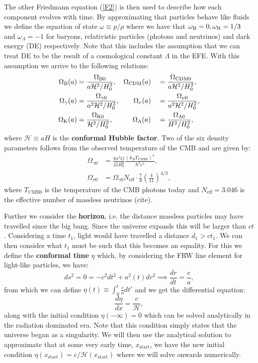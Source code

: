 \documentclass[%
reprint,
 amsmath,amssymb,
 aps,
]{revtex4-2}
\newcommand{\Hp}{\mathcal{H}}
\begin{document}
The other Friedmann equation (\ref{F2}) is then used to describe how each component evolves with time. By approximating that particles behave like fluids we define the equation of state $\omega\equiv p/\rho$ where we have that $\omega_{\text B}=0,\omega_{\text{R}}=1/3$ and $\omega_\Lambda=-1$ for baryons, relativistic particles (photons and neutrinos) and dark energy (DE) respectively. Note that this includes the assumption that we can treat DE to be the result of a cosmological constant $\Lambda$ in the EFE. With this assumption we arrive to the following relations:
\begin{alignat}{2}
	\Omega_{\text B}(a)&=\frac{\Omega_{\text B0}}{a\Hp^2/H_0^2},\hspace{3.5mm}\Omega_{\text{CDM}}(a)&&=\frac{\Omega_{\text{CDM}0}}{a\Hp^2/H_0^2},\nonumber\\
	\label{Otot}
	\Omega_{\gamma}(a)&=\frac{\Omega_{\gamma0}}{a^2\Hp^2/H_0^2},\hspace{7mm}\Omega_{\nu}(a)&&=\frac{\Omega_{\nu0}}{a^2\Hp^2/H_0^2},\\
	\Omega_{\text K}(a)&=\frac{\Omega_{\text K0}}{\Hp^2/H_0^2},\hspace{10mm}\Omega_{\Lambda}(a)&&=\frac{\Omega_{\Lambda0}}{H^2/H_0^2},\nonumber
\end{alignat}
where $\Hp\equiv aH$ is the \textbf{conformal Hubble factor}. 
Two of the six density parameters follows from the observed temperature of the CMB and are given by:
\begin{align}
	\label{ORad}
	\Omega_{\gamma0}&=\frac{8\pi^3 G}{45 H_0^2}\frac{(k_BT_{\text{CMB}0})^4}{\hbar^3 c^5},\\
	\label{ONu}
	\Omega_{\nu0}&=\Omega_{\gamma0}N_{\text{eff}}\cdot\frac{7}{8}\left(\frac{4}{11}\right)^{4/3},
\end{align}
where $T_{\text{CMB}0}$ is the temperature of the CMB photons today and $N_{\text{eff}}=3.046$ is the effective number of massless neutrinos (cite). 

Further we consider the \textbf{horizon}, i.e. the distance massless particles may have travelled since the big bang. Since the universe expands this will be larger than $ct$. Considering a time $t_1$, light would have travelled a distance $d_1>ct_1$. We can then consider what $t_1$ must be such that this becomes an equality. For this we define the \textbf{conformal time} $\eta$ which, by considering the FRW line element for light-like particles, we have:
\[ds^2=0=-c^2dt^2+a^2(t)dr^2\implies \frac{dr}{dt}=\frac{c}{a},\]
from which we can define $\eta(t)\equiv\int_0^t\frac{c}{a}dt'$ and we get the differential equation:
\begin{equation}
	\frac{d\eta}{dx}=\frac{c}{\Hp},\label{detaODE}
\end{equation}
along with the initial condition $\eta(-\infty)=0$ which can be solved analytically in the radiation dominated era. Note that this condition simply states that the universe began as a singularity. We will then use the analytical solution to approximate that at some very early time, $x_\text{start}$, we have the new initial condition $\eta(x_\text{start})=c/\Hp(x_\text{start})$ where we will solve onwards numerically. 
\end{document}
